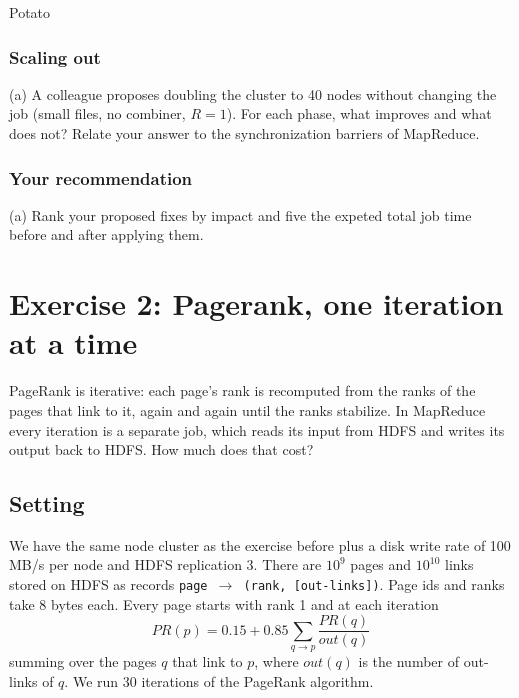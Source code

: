 \documentclass[11pt,a4paper]{article}
\begin{document}
    Potato

\subsubsection*{Scaling out}
\begin{tcolorbox}[colback=gray!20,colframe=gray!20, sharp corners]
        (a) A colleague proposes doubling the cluster to 40 nodes without changing the job (small files, no combiner, $R=1$). For each phase, what improves and what does not? Relate your answer to the synchronization barriers of MapReduce.
\end{tcolorbox}

\subsubsection*{Your recommendation}
    \begin{tcolorbox}[colback=gray!20,colframe=gray!20, sharp corners]
            (a) Rank your proposed fixes by impact and five the expeted total job time before and after applying them.
    \end{tcolorbox}

    \newpage 
\section*{Exercise 2: Pagerank, one iteration at a time}
PageRank is iterative: each page's rank is recomputed from the ranks of the pages that link to it, again and again until the ranks stabilize. In MapReduce every iteration is a separate job, which reads its input from HDFS and writes its output back to HDFS. How much does that cost?
\subsection*{Setting}
We have the same node cluster as the exercise before plus a disk write rate of 100 MB/s per node and HDFS replication 3.\newline
There are $10^9$ pages and $10^{10}$ links stored on HDFS as records \texttt{page $\rightarrow$ (rank, [out-links])}. Page ids and ranks take 8 bytes each. \newline
Every page starts with rank 1 and at each iteration 
\begin{equation*}
    PR(p) = 0.15 + 0.85 \sum_{q \rightarrow p } \frac{PR(q)}{out(q)}
\end{equation*}
summing over the pages $q$ that link to $p$, where $out(q)$ is the number of out-links of $q$. \newline
We run 30 iterations of the PageRank algorithm.
\end{document}
